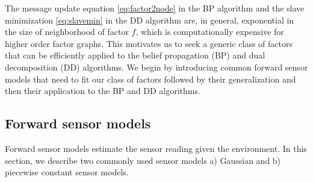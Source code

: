 \documentclass[letterpaper, 10 pt, conference]{ieeeconf} %
\begin{document}
The message update equation \eqref{eq:factor2node} in the BP algorithm and
the slave minimization \eqref{eq:slavemin} in the DD algorithm are, in general,
exponential in the size of neighborhood of factor $f$, which is
computationally expensive for higher order factor graphs. 
This motivates us to seek a generic class of factors that can be efficiently
applied to the belief propagation (BP) and dual decomposition (DD) algorithms.
We begin by introducing common forward sensor models that need to fit our
class of factors followed by their generalization and then their application
to the BP and DD algorithms.

\subsection{Forward sensor models}
\label{sec:forward}
Forward sensor models estimate the sensor reading given the environment.
In this section, we describe two commonly used sensor models a)
Gaussian and b) piecewise constant sensor models.
\end{document}
